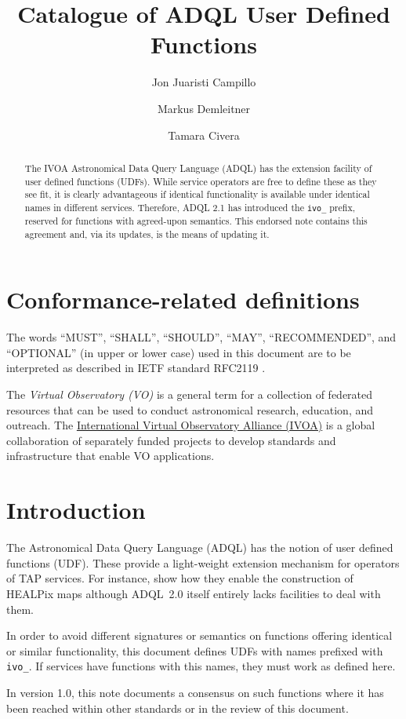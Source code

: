 \documentclass[11pt,a4paper]{ivoa}
\title{Catalogue of ADQL User Defined Functions}
\author[https://wiki.ivoa.net/twiki/bin/view/IVOA/JonJuaristiCampillo]{Jon Juaristi Campillo}
\author[https://wiki.ivoa.net/twiki/bin/view/IVOA/MarkusDemleitner]{Markus Demleitner}
\author[https://wiki.ivoa.net/twiki/bin/view/IVOA/TamaraCivera]{Tamara Civera}
\begin{document}
\begin{abstract}
The IVOA Astronomical Data Query Language (ADQL) has the extension
facility of user defined functions (UDFs).  While service operators are
free to define these as they see fit, it is clearly advantageous if
identical functionality is available under identical names in different
services.  Therefore, ADQL 2.1 has introduced the \verb|ivo_| prefix,
reserved for functions with agreed-upon semantics.  This endorsed note
contains this agreement and, via its updates, is the means of updating
it.
\end{abstract}


\section*{Conformance-related definitions}

The words ``MUST'', ``SHALL'', ``SHOULD'', ``MAY'', ``RECOMMENDED'', and
``OPTIONAL'' (in upper or lower case) used in this document are to be
interpreted as described in IETF standard RFC2119 \citep{std:RFC2119}.

The \emph{Virtual Observatory (VO)} is a
general term for a collection of federated resources that can be used
to conduct astronomical research, education, and outreach.
The \href{http://www.ivoa.net}{International
Virtual Observatory Alliance (IVOA)} is a global
collaboration of separately funded projects to develop standards and
infrastructure that enable VO applications.


\section{Introduction}

The Astronomical Data Query Language (ADQL) \citep{2008ivoa.spec.1030O}
has the notion of user defined functions (UDF).  These provide a
light-weight extension mechanism for operators of TAP services.
For instance, \citet{2016arXiv161109190T} show how they enable the
construction of HEALPix maps although ADQL~2.0 itself entirely lacks
facilities to deal with them.

In order to avoid different signatures or semantics on functions
offering identical or similar functionality,  this document defines UDFs
with names prefixed with \verb|ivo_|.  If services have functions with
this names, they must work as defined here.

In version 1.0, this note documents a consensus
on such functions where it has been
reached within other standards or in the review of this document.
\end{document}

